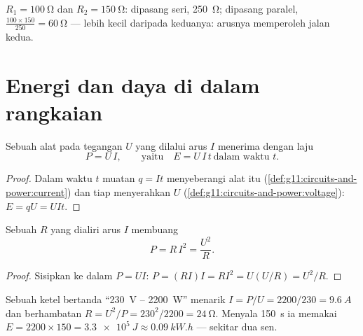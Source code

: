 \begin{example}\label{ex:g11:circuits-and-power:networks}
$R_1 = \qty{100}{\ohm}$ dan $R_2 = \qty{150}{\ohm}$: dipasang seri,
\qty{250}{\ohm}; dipasang paralel, $\frac{100 \times 150}{250} =
\qty{60}{\ohm}$ --- lebih kecil daripada keduanya: arusnya memperoleh
jalan kedua.
\end{example}

\section{Energi dan daya di dalam rangkaian}

\begin{proposition}\label{prop:g11:circuits-and-power:power}
Sebuah alat pada tegangan $U$ yang dilalui arus $I$ menerima 
dengan laju
\[ P = U\,I , \qquad\text{yaitu}\quad E = U\,I\,t \ \text{dalam waktu } t . \]
\end{proposition}

\begin{proof}
Dalam waktu $t$ muatan $q = It$ menyeberangi alat itu
(\cref{def:g11:circuits-and-power:current}) dan tiap 
menyerahkan $U$  (\cref{def:g11:circuits-and-power:voltage}):
$E = qU = UIt$.
\end{proof}

\begin{proposition}\label{prop:g11:circuits-and-power:ri2}
Sebuah  $R$ yang dialiri arus $I$ membuang 
\[ P = R\,I^2 = \frac{U^2}{R} . \]
\end{proposition}

\begin{proof}
Sisipkan  ke dalam $P = UI$:
$P = (RI)I = RI^2 = U(U/R) = U^2/R$.
\end{proof}

\begin{example}\label{ex:g11:circuits-and-power:nameplate}
Sebuah ketel bertanda ``\qty{230}{V} -- \qty{2200}{W}'' menarik
$I = P/U =
2200/230 = \qty{9.6}{A}$ dan berhambatan
$R = U^2/P = 230^2/2200 =
\qty{24}{\ohm}$. Menyala \qty{150}{s} ia
memakai $E = 2200 \times 150 =
\qty{3.3e5}{J} \approx \qty{0.09}{kW.h}$
--- sekitar dua sen.
\end{example}

